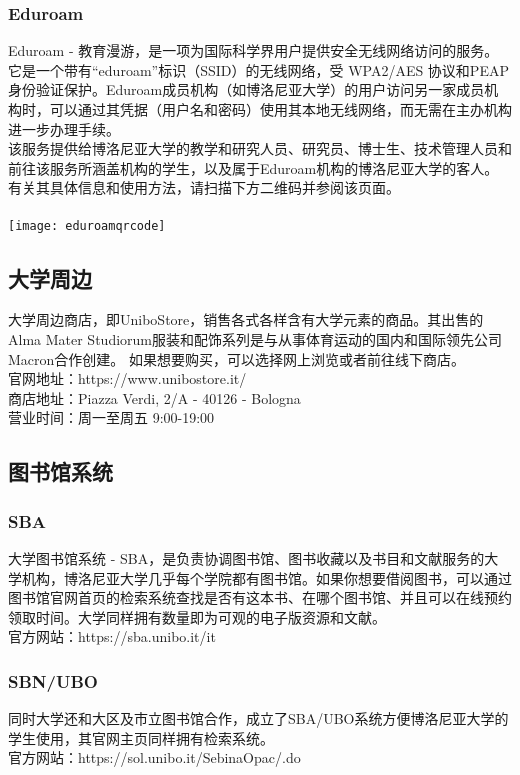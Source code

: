 \subsubsection{Eduroam}
Eduroam - 教育漫游，是一项为国际科学界用户提供安全无线网络访问的服务。它是一个带有“eduroam”标识（SSID）的无线网络，受 WPA2/AES 协议和PEAP身份验证保护。Eduroam成员机构（如博洛尼亚大学）的用户访问另一家成员机构时，可以通过其凭据（用户名和密码）使用其本地无线网络，而无需在主办机构进一步办理手续。\\
该服务提供给博洛尼亚大学的教学和研究人员、研究员、博士生、技术管理人员和前往该服务所涵盖机构的学生，以及属于Eduroam机构的博洛尼亚大学的客人。\\
有关其具体信息和使用方法，请扫描下方二维码并参阅该页面。\\
\\
\texttt{[image: eduroamqrcode]}

\subsection{大学周边}
大学周边商店，即UniboStore，销售各式各样含有大学元素的商品。其出售的Alma Mater Studiorum服装和配饰系列是与从事体育运动的国内和国际领先公司Macron合作创建。
如果想要购买，可以选择网上浏览或者前往线下商店。\\
官网地址：https://www.unibostore.it/\\
商店地址：Piazza Verdi, 2/A - 40126 - Bologna\\
营业时间：周一至周五 9:00-19:00

\subsection{图书馆系统}
\subsubsection{SBA}
大学图书馆系统 - SBA，是负责协调图书馆、图书收藏以及书目和文献服务的大学机构，博洛尼亚大学几乎每个学院都有图书馆。如果你想要借阅图书，可以通过图书馆官网首页的检索系统查找是否有这本书、在哪个图书馆、并且可以在线预约领取时间。大学同样拥有数量即为可观的电子版资源和文献。\\
官方网站：https://sba.unibo.it/it\\
\subsubsection{SBN/UBO}
同时大学还和大区及市立图书馆合作，成立了SBA/UBO系统方便博洛尼亚大学的学生使用，其官网主页同样拥有检索系统。\\
官方网站：https://sol.unibo.it/SebinaOpac/.do

